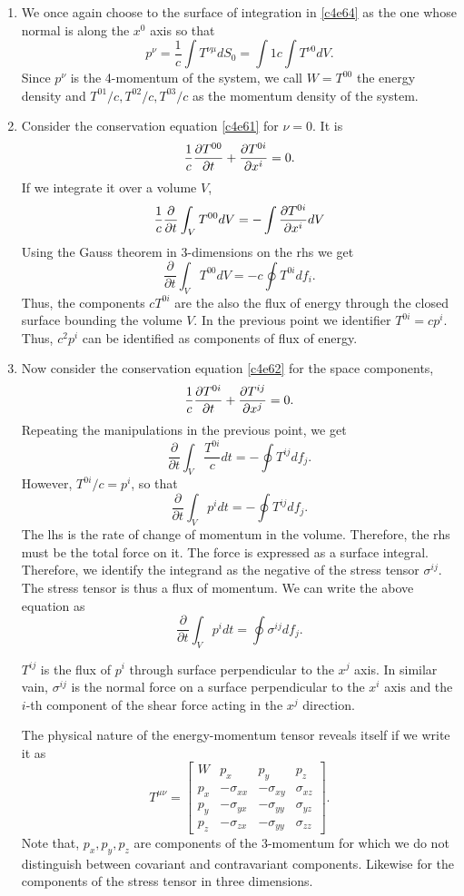 \begin{enumerate}
\item We once again choose to the surface of integration in \eqref{c4e64} as the
one whose normal is along the $x^0$ axis so that
\[
p^\nu = \frac{1}{c}\int T^{\nu\mu}dS_0 = \int{1}{c}\int T^{\nu 0}dV.
\]
Since $p^\nu$ is the 4-momentum of the system, we call $W = T^{00}$ the energy
density and $T^{01}/c, T^{02}/c, T^{03}/c$ as the momentum density of the system.

\item Consider the conservation equation \eqref{c4e61} for $\nu = 0$. It is
\[
\frac{1}{c}\frac{\partial{T^{00}}}{\partial{t}} + \frac{\partial{T^{0i}}}{\partial{x^i}} = 0.
\]
If we integrate it over a volume $V$, 
\[
\frac{1}{c}\frac{\partial}{\partial t}\int_V T^{00}dV = -\int\frac{\partial{T^{0i}}}{\partial{x^i}}dV
\]
Using the Gauss theorem in 3-dimensions on the rhs we get
\[
\frac{\partial}{\partial t}\int_V T^{00}dV = -c\oint T^{0i}df_i.
\]
Thus, the components $cT^{0i}$ are the also the flux of energy through the closed
surface bounding the volume $V$. In the previous point we identifier $T^{0i} = 
cp^i$. Thus, $c^2p^i$ can be identified as components of flux of energy.

\item Now consider the conservation equation \eqref{c4e62} for the space
components,
\[
\frac{1}{c}\frac{\partial{T^{0i}}}{\partial{t}} + \frac{\partial{T^{ij}}}{\partial{x^j}} = 0.
\]
Repeating the manipulations in the previous point, we get
\[
\frac{\partial}{\partial t}\int_V \frac{T^{0i}}{c} dt = -\oint T^{ij}df_j.
\]
However, $T^{0i}/c = p^i$, so that
\[
\frac{\partial}{\partial t}\int_V p^i dt = -\oint T^{ij}df_j.
\]
The lhs is the rate of change of momentum in the volume. Therefore, the rhs must
be the total force on it. The force is expressed as a surface integral. Therefore,
we identify the integrand as the negative of the stress tensor $\sigma^{ij}$. The
stress tensor is thus a flux of momentum. We can write the above equation as
\begin{equation}\label{c4e74}
\frac{\partial}{\partial t}\int_V p^i dt = \oint \sigma^{ij}df_j.
\end{equation}

$T^{ij}$ is the flux of $p^i$ through surface perpendicular to the $x^j$ axis. In
similar vain, $\sigma^{ij}$ is the normal force on a surface perpendicular to the
$x^i$ axis and the $i$-th component of the shear force acting in the $x^j$ 
direction.

The physical nature of the energy-momentum tensor reveals itself if we write it as
\begin{equation}\label{c4e75}
T^{\mu\nu} = \begin{bmatrix}
W & p_x & p_y & p_z \\
p_x & -\sigma_{xx} & -\sigma_{xy} & \sigma_{xz} \\
p_y & -\sigma_{yx} & -\sigma_{yy} & \sigma_{yz} \\
p_z & -\sigma_{zx} & -\sigma_{yy} & \sigma_{zz}
\end{bmatrix}.
\end{equation}
Note that, $p_x, p_y, p_z$ are components of the 3-momentum for which we do not
distinguish between covariant and contravariant components. Likewise for the
components of the stress tensor in three dimensions.


\end{enumerate}
